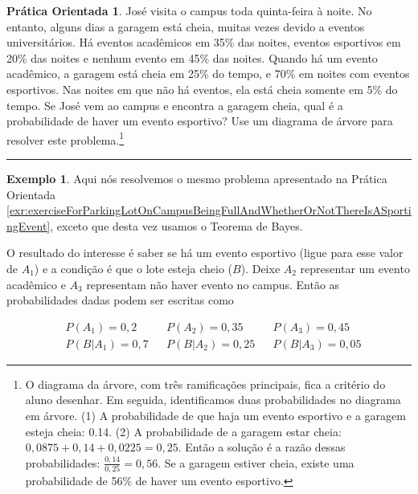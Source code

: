 \documentclass[
]{book}
\theoremstyle{definition}
\theoremstyle{definition}
\newtheorem{example}{Exemplo}[chapter]
\theoremstyle{definition}
\newtheorem{exercise}{Prática Orientada}[chapter]
\theoremstyle{definition}
\theoremstyle{remark}
\begin{document}
\begin{exercise}
\protect\hypertarget{exr:exerciseForParkingLotOnCampusBeingFullAndWhetherOrNotThereIsASportingEvent}{}{\label{exr:exerciseForParkingLotOnCampusBeingFullAndWhetherOrNotThereIsASportingEvent} }José visita o campus toda quinta-feira à noite. No entanto, alguns dias a garagem está cheia, muitas vezes devido a eventos universitários. Há eventos acadêmicos em 35\% das noites, eventos esportivos em 20\% das noites e nenhum evento em 45\% das noites. Quando há um evento acadêmico, a garagem está cheia em 25\% do tempo, e 70\% em noites com eventos esportivos. Nas noites em que não há eventos, ela está cheia somente em 5\% do tempo. Se José vem ao campus e encontra a garagem cheia, qual é a probabilidade de haver um evento esportivo? Use um diagrama de árvore para resolver este problema.\footnote{O diagrama da árvore, com três ramificações principais, fica a critério do aluno desenhar. Em seguida, identificamos duas probabilidades no diagrama em árvore. (1) A probabilidade de que haja um evento esportivo e a garagem esteja cheia: 0.14. (2) A probabilidade de a garagem estar cheia: \(0,0875 + 0,14 + 0,0225 = 0,25\). Então a solução é a razão dessas probabilidades: \(\frac{0,14}{0,25} = 0,56\). Se a garagem estiver cheia, existe uma probabilidade de 56\% de haver um evento esportivo.}
\end{exercise}

\begin{center}\rule{0.5\linewidth}{0.5pt}\end{center}

\begin{example}
\protect\hypertarget{exm:unnamed-chunk-67}{}{\label{exm:unnamed-chunk-67} }Aqui nós resolvemos o mesmo problema apresentado na Prática Orientada \ref{exr:exerciseForParkingLotOnCampusBeingFullAndWhetherOrNotThereIsASportingEvent}, exceto que desta vez usamos o Teorema de Bayes.
\end{example}

O resultado do interesse é saber se há um evento esportivo (ligue para esse valor de \(A_1\)) e a condição é que o lote esteja cheio (\(B\)). Deixe \(A_2\) representar um evento acadêmico e \(A_3\) representam não haver evento no campus. Então as probabilidades dadas podem ser escritas como

\begin{align*}
&P(A_1) = 0,2 &&P(A_2) = 0,35 &&P(A_3) = 0,45 \\
&P(B | A_1) = 0,7 &&P(B | A_2) = 0,25 &&P(B | A_3) = 0,05
\end{align*}
\end{document}

